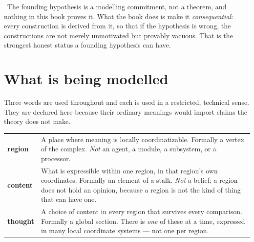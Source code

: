 \begin{hon}\Hon
\Proposed\ The founding hypothesis is a modelling commitment, not a theorem,
and nothing in this book proves it. What the book does is make it
\emph{consequential}: every construction is derived from it, so that if the
hypothesis is wrong, the constructions are not merely unmotivated but
provably vacuous. That is the strongest honest status a founding hypothesis
can have.
\end{hon}

\section{What is being modelled}

Three words are used throughout and each is used in a restricted, technical
sense. They are declared here because their ordinary meanings would import
claims the theory does not make.

\begin{center}
\begin{tabular}{@{}>{\raggedright\arraybackslash}p{}%
                  >{\raggedright\arraybackslash}p{}@{}}
\toprule
\textbf{region} &
  A place where meaning is locally coordinatizable. Formally a vertex of the
  complex. \emph{Not} an agent, a module, a subsystem, or a processor.\\
\addlinespace[3pt]
\textbf{content} &
  What is expressible within one region, in that region's own coordinates.
  Formally an element of a stalk. \emph{Not} a belief; a region does not
  hold an opinion, because a region is not the kind of thing that can have
  one.\\
\addlinespace[3pt]
\textbf{thought} &
  A choice of content in every region that survives every comparison.
  Formally a global section. There is \emph{one} of these at a time, expressed
  in many local coordinate systems --- not one per region.\\
\bottomrule
\end{tabular}
\end{center}

